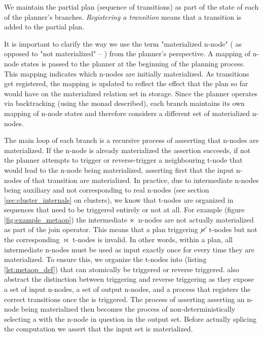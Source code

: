 We maintain the partial plan (sequence of transitions) as part of the
state of each of the planner's branches. \emph{Registering a
  transition} means that a transition is added to the partial plan.

It is important to clarify the way we use the term "materialized n-node"
( as opposed to "not materialized" -- ) from the planner's
perspective. A mapping of n-node states is passed to the planner at the
beginning of the planning process. This mapping indicates which n-nodes
are initially materialized. As transitions get registered,
the mapping is updated to reflect the effect that the plan so far
would have on the materialized relation set in storage. Since the
planner operates via backtracking (using the  monad described),
each branch maintains its own mapping of n-node states and therefore
considers a different set of materialized n-nodes.



The main loop of each branch is a recursive process of asseerting that
n-nodes are materialized. If the n-node is already materialized the
assertion succeeds, if not the planner attempts to trigger or reverse-trigger
a neighbouring t-node that would lead to the n-node being
materialized, asserting first that the input n-nodes of that transition
are materialized. In practice, due to intermediate n-nodes being
auxiliary and not corresponding to real n-nodes (see section
\ref{sec:cluster_internals} on clusters), we know that t-nodes are
organized in sequences that need to be triggered entirely or not at
all. For example (figure \ref{fig:example_metaop}) the intermediate
\(\ltimes\) n-nodes are not actually materialized as part of the join
operator. This means that a plan triggering \(\cancel\ltimes\) t-nodes but
not the corresponding \(\Join\) t-nodes is invalid. In other words,
within a plan, all intermediate n-nodes must be used as input exactly
once for every time they are materialized. To ensure this, we organize
the t-nodes into  (listing \ref{lst:metaop_def}) that
can atomically be triggered or reverse triggered.  also
abstract the distinction between triggering and reverse triggering as
they expose a set of input n-nodes, a set of output n-nodes, and a process that
registers the correct transitions once the  is
triggered. The process of asserting asserting an n-node being
materialized then becomes the process of non-deterministically
selecting a  with the n-node in question in the output
set. Before actually splicing the  computation we assert
that the input set is materialized.


